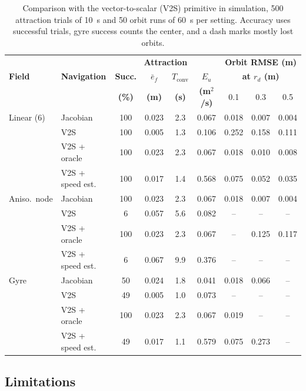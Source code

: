 \documentclass[lettersize,journal]{IEEEtran}
\newcommand{\rev}[1]{#1}
\begin{document}
\begin{table}[!t]
\centering
\scriptsize
\caption{Comparison with the vector-to-scalar (V2S) primitive in simulation, \rev{500} attraction trials of 10~s and \rev{50} orbit runs of 60~s per setting. Accuracy uses successful trials, gyre success counts the center, and a dash marks mostly lost orbits.}
\label{tab:baselines}
\setlength{\tabcolsep}{1.8pt}
\rev{\begin{tabular}{ll|cccc|ccc}
\hline
 & & \multicolumn{4}{c|}{\textbf{Attraction}} & \multicolumn{3}{c}{\textbf{Orbit RMSE (m)}} \\
\textbf{Field} & \textbf{Navigation} & \textbf{Succ.} & \textbf{$\bar{e}_f$} & \textbf{$T_{\mathrm{conv}}$} & \textbf{$E_u$} & \multicolumn{3}{c}{\textbf{at $r_d$ (m)}} \\
 & & \textbf{(\%)} & \textbf{(m)} & \textbf{(s)} & \textbf{(m$^2$/s)} & 0.1 & 0.3 & 0.5 \\
\hline
Linear (6) & Jacobian & 100 & 0.023 & 2.3 & 0.067 & 0.018 & 0.007 & 0.004 \\
 & V2S & 100 & 0.005 & 1.3 & 0.106 & 0.252 & 0.158 & 0.111 \\
 & V2S + oracle & 100 & 0.023 & 2.3 & 0.067 & 0.018 & 0.010 & 0.008 \\
 & V2S + speed est. & 100 & 0.017 & 1.4 & 0.568 & 0.075 & 0.052 & 0.035 \\
\hline
Aniso.\ node & Jacobian & 100 & 0.023 & 2.3 & 0.067 & 0.018 & 0.007 & 0.004 \\
 & V2S & 6 & 0.057 & 5.6 & 0.082 & -- & -- & -- \\
 & V2S + oracle & 100 & 0.023 & 2.3 & 0.067 & -- & 0.125 & 0.117 \\
 & V2S + speed est. & 6 & 0.067 & 9.9 & 0.376 & -- & -- & -- \\
\hline
Gyre & Jacobian & 50 & 0.024 & 1.8 & 0.041 & 0.018 & 0.066 & -- \\
 & V2S & 49 & 0.005 & 1.0 & 0.073 & -- & -- & -- \\
 & V2S + oracle & 100 & 0.023 & 2.3 & 0.067 & 0.019 & -- & -- \\
 & V2S + speed est. & 49 & 0.017 & 1.1 & 0.579 & 0.075 & 0.273 & -- \\
\hline
\end{tabular}}
\end{table}

\subsection{Limitations}
\end{document}
